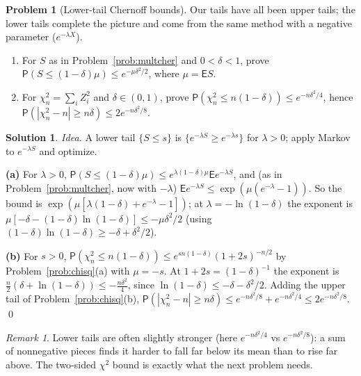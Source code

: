 \documentclass[14pt]{extarticle}
\theoremstyle{definition}
\newtheorem{exercise}{Problem}
\newtheorem*{solution}{Solution}
\theoremstyle{remark}
\newtheorem*{remark}{Remark}
\newcommand\expc{\mathsf{E}}
\newcommand\prb{\mathsf{P}}
\begin{document}
\begin{exercise}[Lower-tail Chernoff bounds]\label{prob:lowertail}
Our tails have all been upper tails; the lower tails complete the picture and come from the same method with a negative parameter ($e^{-\lambda X}$).
\begin{enumerate}[label=(\alph*)]
\item For $S$ as in Problem~\ref{prob:multcher} and $0<\delta<1$, prove $\prb(S\le(1-\delta)\mu)\le e^{-\mu\delta^2/2}$, where $\mu=\expc S$.
\item For $\chi^2_n=\sum_iZ_i^2$ and $\delta\in(0,1)$, prove $\prb(\chi^2_n\le n(1-\delta))\le e^{-n\delta^2/4}$, hence $\prb(|\chi^2_n-n|\ge n\delta)\le2e^{-n\delta^2/8}$.
\end{enumerate}
\end{exercise}
\begin{solution}
\emph{Idea.} A lower tail $\{S\le s\}$ is $\{e^{-\lambda S}\ge e^{-\lambda s}\}$ for $\lambda>0$; apply Markov to $e^{-\lambda S}$ and optimize.

\textbf{(a)} For $\lambda>0$, $\prb(S\le(1-\delta)\mu)\le e^{\lambda(1-\delta)\mu}\expc e^{-\lambda S}$, and (as in Problem~\ref{prob:multcher}, now with $-\lambda$) $\expc e^{-\lambda S}\le\exp(\mu(e^{-\lambda}-1))$. So the bound is $\exp(\mu[\lambda(1-\delta)+e^{-\lambda}-1])$; at $\lambda=-\ln(1-\delta)$ the exponent is $\mu[-\delta-(1-\delta)\ln(1-\delta)]\le-\mu\delta^2/2$ (using $(1-\delta)\ln(1-\delta)\ge-\delta+\delta^2/2$).

\textbf{(b)} For $s>0$, $\prb(\chi^2_n\le n(1-\delta))\le e^{sn(1-\delta)}(1+2s)^{-n/2}$ by Problem~\ref{prob:chisq}(a) with $\mu=-s$. At $1+2s=(1-\delta)^{-1}$ the exponent is $\tfrac n2(\delta+\ln(1-\delta))\le-\tfrac{n\delta^2}4$, since $\ln(1-\delta)\le-\delta-\delta^2/2$. Adding the upper tail of Problem~\ref{prob:chisq}(b), $\prb(|\chi^2_n-n|\ge n\delta)\le e^{-n\delta^2/8}+e^{-n\delta^2/4}\le2e^{-n\delta^2/8}$. \qed
\end{solution}
\begin{remark}
Lower tails are often slightly stronger (here $e^{-n\delta^2/4}$ vs $e^{-n\delta^2/8}$): a sum of nonnegative pieces finds it harder to fall far below its mean than to rise far above. The two-sided $\chi^2$ bound is exactly what the next problem needs.
\end{remark}
\end{document}
